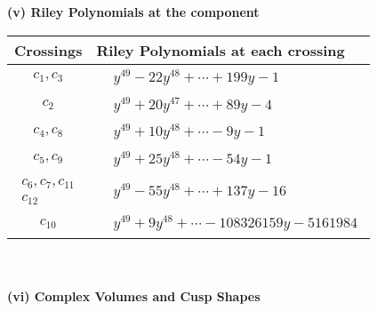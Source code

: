 \documentclass[1p]{elsarticle_modified}
\theoremstyle{definition}
\begin{document}
\newpage\renewcommand{\arraystretch}{1}
\flushleft \textbf{(v) Riley Polynomials at the component}\newline \\
\begin{tabular}{m{50pt}|m{274pt}}
Crossings & \hspace{64pt}Riley Polynomials at each crossing \\
\hline $$\begin{aligned}c_{1},c_{3}\end{aligned}$$&$\begin{aligned}
&y^{49}-22 y^{48}+\cdots+199 y-1
\end{aligned}$\\
\hline $$\begin{aligned}c_{2}\end{aligned}$$&$\begin{aligned}
&y^{49}+20 y^{47}+\cdots+89 y-4
\end{aligned}$\\
\hline $$\begin{aligned}c_{4},c_{8}\end{aligned}$$&$\begin{aligned}
&y^{49}+10 y^{48}+\cdots-9 y-1
\end{aligned}$\\
\hline $$\begin{aligned}c_{5},c_{9}\end{aligned}$$&$\begin{aligned}
&y^{49}+25 y^{48}+\cdots-54 y-1
\end{aligned}$\\
\hline $$\begin{aligned}c_{6},c_{7},c_{11}\\c_{12}\end{aligned}$$&$\begin{aligned}
&y^{49}-55 y^{48}+\cdots+137 y-16
\end{aligned}$\\
\hline $$\begin{aligned}c_{10}\end{aligned}$$&$\begin{aligned}
&y^{49}+9 y^{48}+\cdots-108326159 y-5161984
\end{aligned}$\\
\hline
\end{tabular}\\~\\
\newpage\flushleft \textbf{(vi) Complex Volumes and Cusp Shapes}
\end{document}
